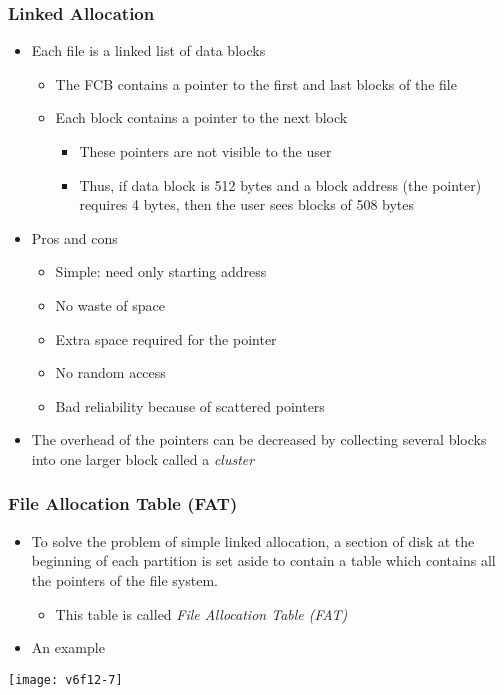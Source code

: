 \documentclass[CJKutf8,dvipsnames,table]{beamer}
\begin{document}
\begin{CJK*}{UTF8}{song}
  \begin{frame}
    \frametitle{Linked Allocation} \pause
    \begin{itemize}\parskip=0pt
    \item Each file is a linked list of data blocks \pause
      \begin{itemize}\parskip=0pt
      \item The FCB contains a pointer to the first and last blocks of the file \pause
      \item Each block contains a pointer to the next block \pause
        \begin{itemize}\parskip=0pt
        \item These pointers are not visible to the user \pause
        \item Thus, if data block is 512 bytes and a block address (the pointer) requires 4 bytes, then the user sees blocks of 508 bytes \pause
        \end{itemize}
      \end{itemize}
    \item Pros and cons \pause
      \begin{itemize}\parskip=0pt
      \item Simple: need only starting address \pause
      \item No waste of space \pause
      \item Extra space required for the pointer \pause
      \item No random access \pause
      \item Bad reliability because of scattered pointers \pause
      \end{itemize}
    \item The overhead of the pointers can be decreased by collecting several blocks into one larger block called a \emph{cluster}
    \end{itemize}
  \end{frame}
  
  \begin{frame}
    \frametitle{File Allocation Table (FAT)} \pause
    \begin{itemize}\parskip=0pt
    \item To solve the problem of simple linked allocation, a section of disk at the beginning of each partition is set aside to contain a table which contains all the pointers of the file system. \pause
      \begin{itemize}\parskip=0pt
      \item This table is called \emph{File Allocation Table (FAT)} \pause
      \end{itemize}
    \item An example \pause
    \end{itemize}
    \begin{center}
      \texttt{[image: v6f12-7]}
    \end{center}
  \end{frame}
  

\end{CJK*}
\end{document}
